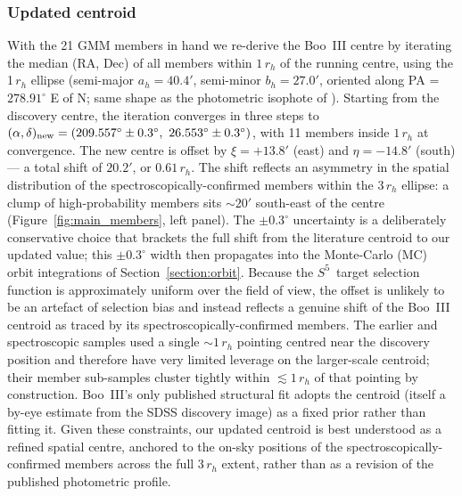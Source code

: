 \documentclass[twocolumn]{aastex631}
\newcommand{\SSSSS}{${S}^5$\xspace}
\begin{document}
\subsubsection{Updated centroid}
With the 21 GMM members in hand we re-derive the Boo~III centre by iterating the median (RA, Dec) of all members within $1\,r_h$ of the running centre, using the 1\,$r_h$ ellipse (semi-major $a_h = 40.4'$, semi-minor $b_h = 27.0'$, oriented along PA = $278.91^\circ$ E of N; same shape as the photometric isophote of \citealt{Moskowitz2020}). Starting from the \citet{Grillmair2009} discovery centre, the iteration converges in three steps to $(\alpha, \delta)_{\rm new} = (209.557^\circ \pm 0.3^\circ,\ 26.553^\circ \pm 0.3^\circ)$, with 11 members inside $1\,r_h$ at convergence. The new centre is offset by $\xi = +13.8'$ (east) and $\eta = -14.8'$ (south) --- a total shift of $20.2'$, or $0.61\,r_h$. The shift reflects an asymmetry in the spatial distribution of the spectroscopically-confirmed members within the $3\,r_h$ ellipse: a clump of high-probability members sits $\sim 20'$ south-east of the \citet{Grillmair2009} centre (Figure~\ref{fig:main_members}, left panel). The $\pm 0.3^\circ$ uncertainty is a deliberately conservative choice that brackets the full shift from the literature \citet{Grillmair2009} centroid to our updated value; this $\pm 0.3^\circ$ width then propagates into the Monte-Carlo (MC) orbit integrations of Section~\ref{section:orbit}. Because the \SSSSS\ target selection function is approximately uniform over the field of view, the offset is unlikely to be an artefact of selection bias and instead reflects a genuine shift of the Boo~III centroid as traced by its spectroscopically-confirmed members.  The earlier \citet{Carlin2018} and \citet{Geha2026} spectroscopic samples used a single $\sim 1\,r_h$ pointing centred near the \citet{Grillmair2009} discovery position and therefore have very limited leverage on the larger-scale centroid; their member sub-samples cluster tightly within $\lesssim 1\,r_h$ of that pointing by construction.  Boo~III's only published structural fit \citep{Moskowitz2020} adopts the \citet{Grillmair2009} centroid (itself a by-eye estimate from the SDSS discovery image) as a fixed prior rather than fitting it.  Given these constraints, our updated centroid is best understood as a refined spatial centre, anchored to the on-sky positions of the spectroscopically-confirmed members across the full $3\,r_h$ extent, rather than as a revision of the published photometric profile.
\end{document}
